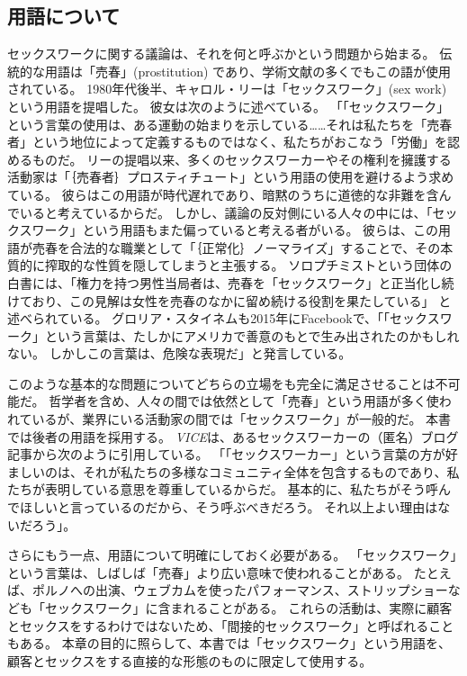 \documentclass[paper=a4,book,openany]{jlreq}
\begin{document}
\subsection{用語について}

セックスワークに関する議論は、それを何と呼ぶかという問題から始まる。
伝統的な用語は「売春」(prostitution) であり、学術文献の多くでもこの語が使用されている。
1980年代後半、キャロル・リーは「セックスワーク」(sex work) という用語を提唱した。
彼女は次のように述べている。
「「セックスワーク」という言葉の使用は、ある運動の始まりを示している……それは私たちを「売春者」という地位によって定義するものではなく、私たちがおこなう「労働」を認めるものだ\citep[p.230]{leigh97:_inven_sex_work}。
リーの提唱以来、多くのセックスワーカーやその権利を擁護する活動家は「｛売春者｝{プロスティチュート}」という用語の使用を避けるよう求めている。
彼らはこの用語が時代遅れであり、暗黙のうちに道徳的な非難を含んでいると考えているからだ。
しかし、議論の反対側にいる人々の中には、「セックスワーク」という用語もまた偏っていると考える者がいる。
彼らは、この用語が売春を合法的な職業として「｛正常化｝{ノーマライズ}」することで、その本質的に搾取的な性質を隠してしまうと主張する。
ソロプチミストという団体の白書には、「権力を持つ男性当局者は、売春を「セックスワーク」と正当化し続けており、この見解は女性を売春のなかに留め続ける役割を果たしている」
と述べられている\citep{soroptimist17:_prost_is_not_choic}。
グロリア・スタイネムも2015年にFacebookで、「「セックスワーク」という言葉は、たしかにアメリカで善意のもとで生み出されたのかもしれない。
しかしこの言葉は、危険な表現だ」と発言している\citep{steinem15:_faceb}。

このような基本的な問題についてどちらの立場をも完全に満足させることは不可能だ。
哲学者を含め、人々の間では依然として「売春」という用語が多く使われているが、業界にいる活動家の間では「セックスワーク」が一般的だ。
本書では後者の用語を採用する。
\emph{VICE}は、あるセックスワーカーの（匿名）ブログ記事から次のように引用している。
「「セックスワーカー」という言葉の方が好ましいのは、それが私たちの多様なコミュニティ全体を包含するものであり、私たちが表明している意思を尊重しているからだ。
基本的に、私たちがそう呼んでほしいと言っているのだから、そう呼ぶべきだろう。
それ以上よい理由はないだろう」\citep{ratchford13:_why_is_canad_media_still}。

さらにもう一点、用語について明確にしておく必要がある。
「セックスワーク」という言葉は、しばしば「売春」より広い意味で使われることがある。
たとえば、ポルノへの出演、ウェブカムを使ったパフォーマンス、ストリップショーなども「セックスワーク」に含まれることがある。
これらの活動は、実際に顧客とセックスをするわけではないため、「間接的セックスワーク」と呼ばれることもある。
本章の目的に照らして、本書では「セックスワーク」という用語を、顧客とセックスをする直接的な形態のものに限定して使用する。
\end{document}

